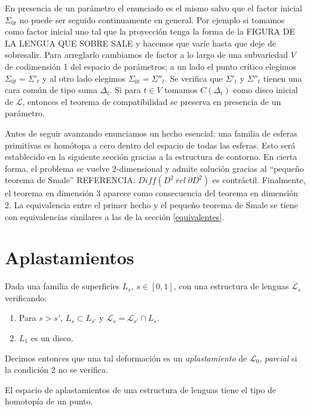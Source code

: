 \documentclass[twoside, 11pt]{article}
\begin{document}
En presencia de un parámetro el enunciado es el mismo salvo que el factor inicial $\Sigma_{0t}$ no puede ser seguido continuamente en general. Por ejemplo si tomamos como factor inicial uno tal que la proyección tenga la forma de la FIGURA DE LA LENGUA QUE SOBRE SALE y hacemos que varíe hasta que deje de sobresalir. Para arreglarlo cambiamos de factor a lo largo de una subvariedad $V$ de codimensión 1 del espacio de parámetros; a un lado el punto crítico elegimos $\Sigma_{0t}=\Sigma'_t$ y al otro lado elegimos $\Sigma_{0t}=\Sigma''_t$. Se verifica que $\Sigma'_t$ y $\Sigma''_t$ tienen una cara común de tipo suma $\Delta_t$. Si para $t\in V$ tomamos $C(\Delta_t)$ como disco inicial de $\mathcal{L}$, entonces el teorema de compatibilidad se preserva en presencia de un parámetro. 

Antes de seguir avanzando enunciamos un hecho esencial: una familia de esferas primitivas es homótopa a cero dentro del espacio de todas las esferas. Esto será establecido en la siguiente sección gracias a la estructura de contorno. En cierta forma, el problema se vuelve 2-dimensional y admite solución gracias al ``pequeño teorema de Smale'' REFERENCIA: $Diff(D^2\ rel\ \partial D^2)$ es contráctil. Finalmente, el teorema en dimensión 3 aparece como consecuencia del teorema en dimensión 2. La equivalencia entre el primer hecho y el pequeño teorema de Smale se tiene con equivalencias similares a las de la sección \ref{equivalentes}. 

\section{Aplastamientos}

\begin{defi}
Dada una familia de superficies $L_s$, $s\in [0,1]$, con una estructura de lenguas $\mathcal{L}_s$ verificando:
\begin{enumerate}
\item Para $s>s'$, $L_s\subset L_{s'}$ y $\mathcal{L}_s=\mathcal{L}_{s'}\cap L_s$.
\item $L_1$ es un disco. 
\end{enumerate}
Decimos entonces que una tal deformación es un \emph{aplastamiento} de $\mathcal{L}_0$, \emph{parcial} si la condición 2 no se verifica. 
\end{defi}

\begin{prop}
El espacio de aplastamientos de una estructura de lenguas tiene el tipo de homotopía de un punto.
\end{prop}
\end{document}

